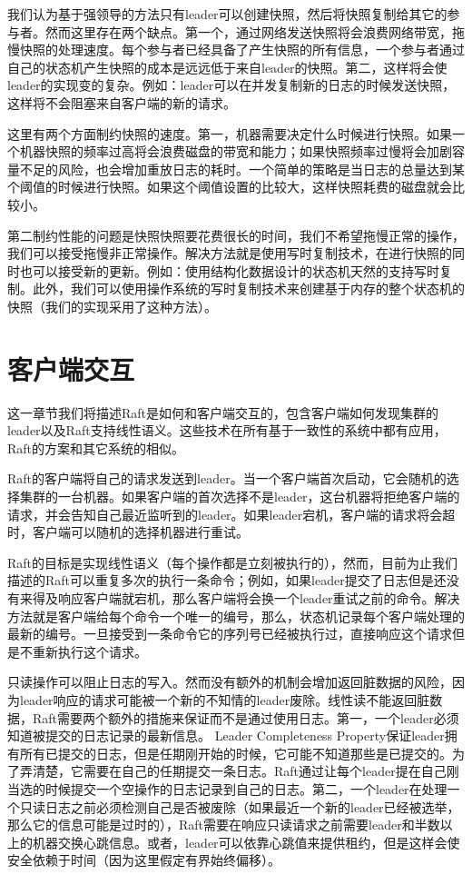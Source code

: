 \documentclass[journal]{IEEEtran}
\begin{document}
我们认为基于强领导的方法只有leader可以创建快照，然后将快照复制给其它的参与者。然而这里存在两个缺点。第一个，通过网络发送快照将会浪费网络带宽，拖慢快照的处理速度。每个参与者已经具备了产生快照的所有信息，一个参与者通过自己的状态机产生快照的成本是远远低于来自leader的快照。第二，这样将会使leader的实现变的复杂。例如：leader可以在并发复制新的日志的时候发送快照，这样将不会阻塞来自客户端的新的请求。

这里有两个方面制约快照的速度。第一，机器需要决定什么时候进行快照。如果一个机器快照的频率过高将会浪费磁盘的带宽和能力；如果快照频率过慢将会加剧容量不足的风险，也会增加重放日志的耗时。一个简单的策略是当日志的总量达到某个阈值的时候进行快照。如果这个阈值设置的比较大，这样快照耗费的磁盘就会比较小。

第二制约性能的问题是快照快照要花费很长的时间，我们不希望拖慢正常的操作，我们可以接受拖慢非正常操作。解决方法就是使用写时复制技术，在进行快照的同时也可以接受新的更新。例如：使用结构化数据设计的状态机天然的支持写时复制。此外，我们可以使用操作系统的写时复制技术来创建基于内存的整个状态机的快照（我们的实现采用了这种方法）。

\section{客户端交互}

这一章节我们将描述Raft是如何和客户端交互的，包含客户端如何发现集群的leader以及Raft支持线性语义。这些技术在所有基于一致性的系统中都有应用，Raft的方案和其它系统的相似。

Raft的客户端将自己的请求发送到leader。当一个客户端首次启动，它会随机的选择集群的一台机器。如果客户端的首次选择不是leader，这台机器将拒绝客户端的请求，并会告知自己最近监听到的leader。如果leader宕机，客户端的请求将会超时，客户端可以随机的选择机器进行重试。

Raft的目标是实现线性语义（每个操作都是立刻被执行的），然而，目前为止我们描述的Raft可以重复多次的执行一条命令；例如，如果leader提交了日志但是还没有来得及响应客户端就宕机，那么客户端将会换一个leader重试之前的命令。解决方法就是客户端给每个命令一个唯一的编号，那么，状态机记录每个客户端处理的最新的编号。一旦接受到一条命令它的序列号已经被执行过，直接响应这个请求但是不重新执行这个请求。

只读操作可以阻止日志的写入。然而没有额外的机制会增加返回脏数据的风险，因为leader响应的请求可能被一个新的不知情的leader废除。线性读不能返回脏数据，Raft需要两个额外的措施来保证而不是通过使用日志。第一，一个leader必须知道被提交的日志记录的最新信息。 Leader Completeness Property保证leader拥有所有已提交的日志，但是任期刚开始的时候，它可能不知道那些是已提交的。为了弄清楚，它需要在自己的任期提交一条日志。Raft通过让每个leader提在自己刚当选的时候提交一个空操作的日志记录到自己的日志。第二，一个leader在处理一个只读日志之前必须检测自己是否被废除（如果最近一个新的leader已经被选举，那么它的信息可能是过时的），Raft需要在响应只读请求之前需要leader和半数以上的机器交换心跳信息。或者，leader可以依靠心跳值来提供租约，但是这样会使安全依赖于时间（因为这里假定有界始终偏移）。
\end{document}
